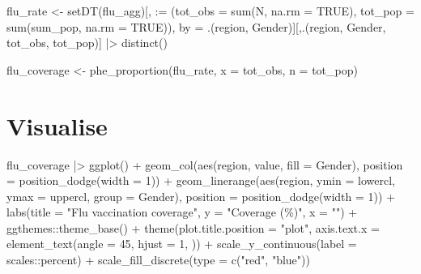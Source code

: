 \documentclass[
  letterpaper,
  DIV=11,
  numbers=noendperiod]{scrreprt}
\newenvironment{Shaded}{\begin{snugshade}}{\end{snugshade}}
\newcommand{\AttributeTok}[1]{\textcolor[rgb]{0.40,0.45,0.13}{#1}}
\newcommand{\ConstantTok}[1]{\textcolor[rgb]{0.56,0.35,0.01}{#1}}
\newcommand{\DecValTok}[1]{\textcolor[rgb]{0.68,0.00,0.00}{#1}}
\newcommand{\FunctionTok}[1]{\textcolor[rgb]{0.28,0.35,0.67}{#1}}
\newcommand{\NormalTok}[1]{\textcolor[rgb]{0.00,0.23,0.31}{#1}}
\newcommand{\OtherTok}[1]{\textcolor[rgb]{0.00,0.23,0.31}{#1}}
\newcommand{\SpecialCharTok}[1]{\textcolor[rgb]{0.37,0.37,0.37}{#1}}
\newcommand{\StringTok}[1]{\textcolor[rgb]{0.13,0.47,0.30}{#1}}
\begin{document}
\begin{Shaded}
\begin{Highlighting}[]
\NormalTok{flu\_rate }\OtherTok{\textless{}{-}} \FunctionTok{setDT}\NormalTok{(flu\_agg)[, }\StringTok{\textasciigrave{}}\AttributeTok{:=}\StringTok{\textasciigrave{}}\NormalTok{ (}\AttributeTok{tot\_obs =} \FunctionTok{sum}\NormalTok{(N, }\AttributeTok{na.rm =} \ConstantTok{TRUE}\NormalTok{), }\AttributeTok{tot\_pop =} \FunctionTok{sum}\NormalTok{(sum\_pop, }\AttributeTok{na.rm =} \ConstantTok{TRUE}\NormalTok{)), by }\OtherTok{=}\NormalTok{ .(region, Gender)][,.(region, Gender, tot\_obs, tot\_pop)] }\SpecialCharTok{|\textgreater{}}
    \FunctionTok{distinct}\NormalTok{()}

\NormalTok{flu\_coverage }\OtherTok{\textless{}{-}} \FunctionTok{phe\_proportion}\NormalTok{(flu\_rate, }\AttributeTok{x =}\NormalTok{ tot\_obs, }\AttributeTok{n =}\NormalTok{ tot\_pop)}
\end{Highlighting}
\end{Shaded}

\section{Visualise}\label{visualise}

\begin{Shaded}
\begin{Highlighting}[]
\NormalTok{flu\_coverage }\SpecialCharTok{|\textgreater{}}
    \FunctionTok{ggplot}\NormalTok{() }\SpecialCharTok{+}
    \FunctionTok{geom\_col}\NormalTok{(}\FunctionTok{aes}\NormalTok{(region, value, }\AttributeTok{fill =}\NormalTok{ Gender), }\AttributeTok{position =} \FunctionTok{position\_dodge}\NormalTok{(}\AttributeTok{width =} \DecValTok{1}\NormalTok{)) }\SpecialCharTok{+}
    \FunctionTok{geom\_linerange}\NormalTok{(}\FunctionTok{aes}\NormalTok{(region, }\AttributeTok{ymin =}\NormalTok{ lowercl, }\AttributeTok{ymax =}\NormalTok{ uppercl, }\AttributeTok{group =}\NormalTok{ Gender), }\AttributeTok{position =} \FunctionTok{position\_dodge}\NormalTok{(}\AttributeTok{width =} \DecValTok{1}\NormalTok{)) }\SpecialCharTok{+}
    \FunctionTok{labs}\NormalTok{(}\AttributeTok{title =} \StringTok{"Flu vaccination coverage"}\NormalTok{, }
         \AttributeTok{y =} \StringTok{"Coverage (\%)"}\NormalTok{, }
         \AttributeTok{x =} \StringTok{""}\NormalTok{) }\SpecialCharTok{+}
\NormalTok{    ggthemes}\SpecialCharTok{::}\FunctionTok{theme\_base}\NormalTok{() }\SpecialCharTok{+}
    \FunctionTok{theme}\NormalTok{(}\AttributeTok{plot.title.position =} \StringTok{"plot"}\NormalTok{, }
          \AttributeTok{axis.text.x =} \FunctionTok{element\_text}\NormalTok{(}\AttributeTok{angle =} \DecValTok{45}\NormalTok{, }\AttributeTok{hjust =} \DecValTok{1}\NormalTok{, )) }\SpecialCharTok{+}
    \FunctionTok{scale\_y\_continuous}\NormalTok{(}\AttributeTok{label =}\NormalTok{ scales}\SpecialCharTok{::}\NormalTok{percent) }\SpecialCharTok{+}
    \FunctionTok{scale\_fill\_discrete}\NormalTok{(}\AttributeTok{type =} \FunctionTok{c}\NormalTok{(}\StringTok{"red"}\NormalTok{, }\StringTok{"blue"}\NormalTok{))}
\end{Highlighting}
\end{Shaded}
\end{document}

